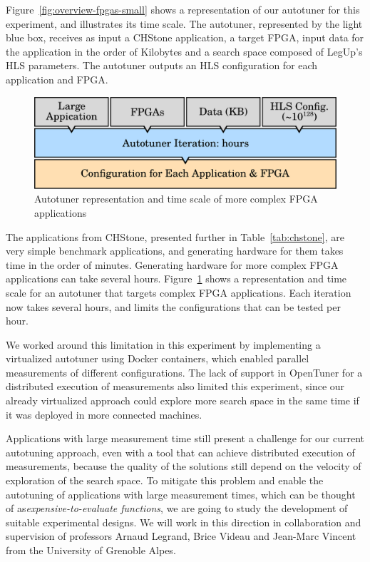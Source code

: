 Figure~\ref{fig:overview-fpgas-small} shows a representation of our autotuner
for this experiment, and illustrates its time scale.  The autotuner,
represented by the light blue box, receives as input a CHStone application, a
target FPGA, input data for the application in the order of Kilobytes and a
search space composed of LegUp's HLS parameters. The autotuner outputs an HLS
configuration for each application and FPGA.

\begin{figure}[htpb]
    \centering
    \includegraphics[width=.65\textwidth]{./images/overview_fpgas_big}
    \caption{Autotuner representation and time scale of more complex FPGA
    applications}
    \label{fig:overview-fpgas-big}
\end{figure}

The applications from CHStone, presented further in Table~\ref{tab:chstone},
are very simple benchmark applications, and generating hardware for them takes
time in the order of minutes. Generating hardware for more complex FPGA
applications can take several hours. Figure~\ref{fig:overview-fpgas-big} shows
a representation and time scale for an autotuner that targets complex FPGA
applications. Each iteration now takes several hours, and limits the
configurations that can be tested per hour.

We worked around this limitation in this experiment by implementing a
virtualized autotuner using Docker containers, which enabled parallel
measurements of different configurations. The lack of support in OpenTuner for
a distributed execution of measurements also limited this experiment, since our
already virtualized approach could explore more search space in the same time
if it was deployed in more connected machines.

Applications with large measurement time still present a challenge for our
current autotuning approach, even with a tool that can achieve distributed
execution of measurements, because the quality of the solutions still depend on
the velocity of exploration of the search space.  To mitigate this problem and
enable the autotuning of applications with large measurement times, which can
be thought of as\textit{expensive-to-evaluate functions}, we are going to study
the development of suitable experimental designs. We will work in this
direction in collaboration and supervision of professors Arnaud Legrand, Brice
Videau and Jean-Marc Vincent from the University of Grenoble Alpes.

